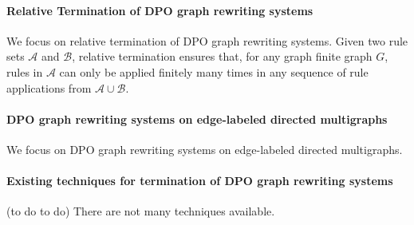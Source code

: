 \paragraph{Relative Termination of DPO graph rewriting systems}
We focus on relative termination of DPO graph rewriting systems. Given two rule sets \( \mathcal{A} \) and \( \mathcal{B} \), relative termination ensures that, for any graph finite graph $G$,
rules in $\mathcal{A}$ can only be applied finitely many times in any sequence of rule applications from $\mathcal{A} \cup \mathcal{B}$. 


\paragraph{DPO graph rewriting systems on edge-labeled directed multigraphs}
We focus on DPO graph rewriting systems on edge-labeled directed multigraphs.

\paragraph{Existing techniques for termination of DPO graph rewriting systems}
(to do to do)
There are not many techniques available.
 
